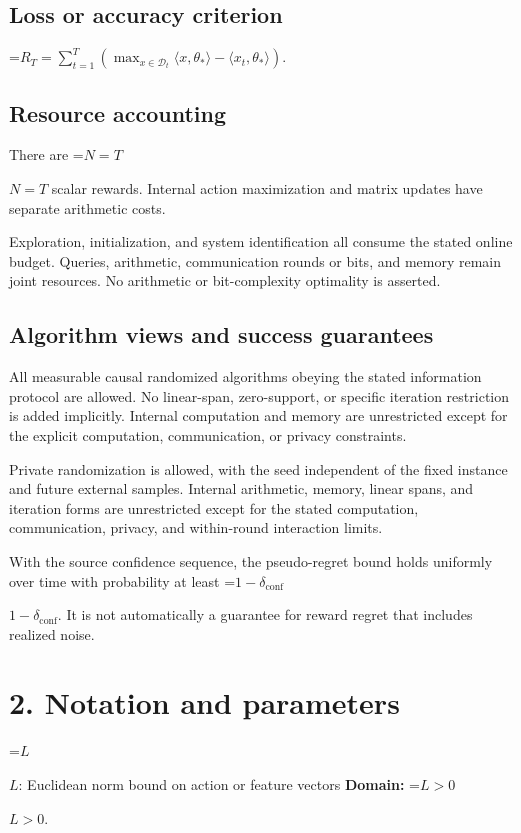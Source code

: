 \documentclass[10pt,a4paper]{article}
\newcommand{\AtlasMath}[1]{\par\begingroup\centering\setbox0=\hbox{$\displaystyle #1$}\ifdim\wd0>1.4\linewidth\typeout{ATLAS WIDE FORMULA: \the\wd0}\fi\ifdim\wd0>\linewidth\resizebox{\linewidth}{!}{\box0}\else\box0\fi\par\endgroup}
\newcommand{\AtlasInlineMath}[1]{\begingroup\setbox0=\hbox{$#1$}\ifdim\wd0>.4\linewidth\endgroup\AtlasMath{#1}\else\endgroup$#1$\fi}
\begin{document}
\subsection{Loss or accuracy criterion}

\AtlasMath{R_T=\sum_{t=1}^{T}\left(\max_{x\in\mathcal{D}_t}\langle x,\theta_*\rangle-\langle x_t,\theta_*\rangle\right).}


\subsection{Resource accounting}
There are \AtlasInlineMath{N=T} scalar rewards. Internal action maximization and matrix updates have separate arithmetic costs.

Exploration, initialization, and system identification all consume the stated online budget. Queries, arithmetic, communication rounds or bits, and memory remain joint resources. No arithmetic or bit-complexity optimality is asserted.

\subsection{Algorithm views and success guarantees}
All measurable causal randomized algorithms obeying the stated information protocol are allowed. No linear-span, zero-support, or specific iteration restriction is added implicitly. Internal computation and memory are unrestricted except for the explicit computation, communication, or privacy constraints.

Private randomization is allowed, with the seed independent of the fixed instance and future external samples. Internal arithmetic, memory, linear spans, and iteration forms are unrestricted except for the stated computation, communication, privacy, and within-round interaction limits.

With the source confidence sequence, the pseudo-regret bound holds uniformly over time with probability at least \AtlasInlineMath{1-\delta_{\mathrm{conf}}}. It is not automatically a guarantee for reward regret that includes realized noise.

\section{2. Notation and parameters}
\AtlasInlineMath{L}: Euclidean norm bound on action or feature vectors \textbf{Domain:} \AtlasInlineMath{L>0}.
\end{document}
